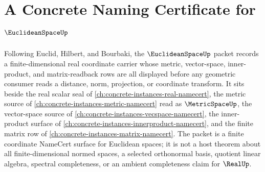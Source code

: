 \chapter{A Concrete Naming Certificate for $\EuclideanSpaceUp$}
\label{ch:concrete-instances-euclidean-space-namecert}

Following Euclid, Hilbert, and Bourbaki, the $\EuclideanSpaceUp$ packet records a finite-dimensional real coordinate carrier whose metric, vector-space, inner-product, and matrix-readback rows are all displayed before any geometric consumer reads a distance, norm, projection, or coordinate transform. It sits beside the real scalar seal of \autoref{ch:concrete-instances-real-namecert}, the metric source of \autoref{ch:concrete-instances-metric-namecert} read as $\MetricSpaceUp$, the vector-space source of \autoref{ch:concrete-instances-vecspace-namecert}, the inner-product surface of \autoref{ch:concrete-instances-innerproduct-namecert}, and the finite matrix row of \autoref{ch:concrete-instances-matrix-namecert}. The packet is a finite coordinate NameCert surface for Euclidean spaces; it is not a host theorem about all finite-dimensional normed spaces, a selected orthonormal basis, quotient linear algebra, spectral completeness, or an ambient completeness claim for $\RealUp$.

